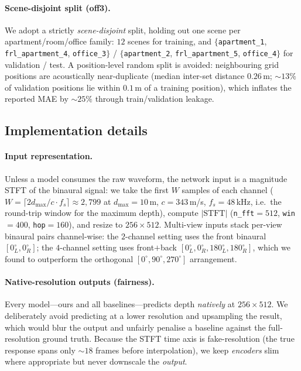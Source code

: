 \paragraph{Scene-disjoint split (off3).}
We adopt a strictly \emph{scene-disjoint} split, holding out one scene per
apartment/room/office family: $12$ scenes for training, and $\{$\texttt{apartment\_1},
\texttt{frl\_apartment\_4}, \texttt{office\_3}$\}$ / $\{$\texttt{apartment\_2},
\texttt{frl\_apartment\_5}, \texttt{office\_4}$\}$ for validation / test. A
position-level random split is avoided: neighbouring grid positions are acoustically
near-duplicate (median inter-set distance $0.26$\,m; ${\sim}13\%$ of validation
positions lie within $0.1$\,m of a training position), which inflates the reported
MAE by ${\sim}25\%$ through train/validation leakage.

\subsection{Implementation details}
\label{sec:impl}

\paragraph{Input representation.}
Unless a model consumes the raw waveform, the network input is a magnitude STFT of
the binaural signal: we take the first $W$ samples of each channel
($W = \lceil 2 d_{\max}/c \cdot f_s \rceil \approx 2{,}799$ at $d_{\max}=10$\,m,
$c=343$\,m/s, $f_s=48$\,kHz, i.e.\ the round-trip window for the maximum depth),
compute $\lvert\mathrm{STFT}\rvert$ (\texttt{n\_fft}$=512$, \texttt{win}$=400$,
\texttt{hop}$=160$), and resize to $256\times512$. Multi-view inputs stack per-view
binaural pairs channel-wise: the $2$-channel setting uses the front binaural
$[0^\circ_L,0^\circ_R]$; the $4$-channel setting uses front$+$back
$[0^\circ_L,0^\circ_R,180^\circ_L,180^\circ_R]$, which we found to outperform the
orthogonal $[0^\circ,90^\circ,270^\circ]$ arrangement.

\paragraph{Native-resolution outputs (fairness).}
Every model---ours and all baselines---predicts depth \emph{natively} at
$256\times512$. We deliberately avoid predicting at a lower resolution and
upsampling the result, which would blur the output and unfairly penalise a baseline
against the full-resolution ground truth. Because the STFT time axis is
fake-resolution (the true response spans only ${\sim}18$ frames before
interpolation), we keep \emph{encoders} slim where appropriate but never downscale
the \emph{output}.

